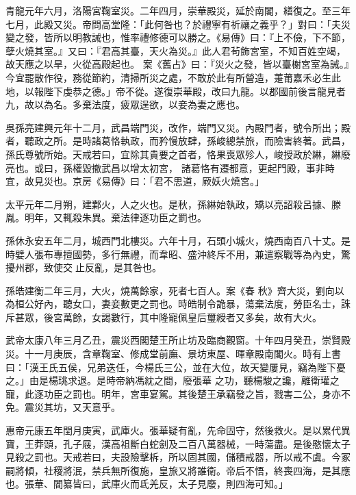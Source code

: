 \begin{pinyinscope}
 青龍元年六月，洛陽宮鞠室災。二年四月，崇華殿災，延於南閣，繕復之。至三年七月，此殿又災。帝問高堂隆：「此何咎也？於禮寧有祈禳之義乎？」對曰：「夫災變之發，皆所以明教誡也，惟率禮修德可以勝之。《易傳》曰：『上不儉，下不節，孽火燒其室。』又曰：『君高其臺，天火為災。』此人君茍飾宮室，不知百姓空竭，故天應之以旱，火從高殿起也。
 案《舊占》曰：『災火之發，皆以臺榭宮室為誡。』今宜罷散作役，務從節約，清掃所災之處，不敢於此有所營造，萐莆嘉禾必生此地，以報陛下虔恭之德。」帝不從。遂復崇華殿，改曰九龍。以郡國前後言龍見者九，故以為名。多棄法度，疲眾逞欲，以妾為妻之應也。



 吳孫亮建興元年十二月，武昌端門災，改作，端門又災。內殿門者，號令所出；殿者，聽政之所。是時諸葛恪執政，而矜慢放肆，孫峻總禁旅，而險害終著。武昌，孫氏尊號所始。天戒若曰，宜除其貴要之首者，恪果喪眾殄人，峻授政於綝，綝廢亮也。或曰，孫權毀撤武昌以增太初宮，
 諸葛恪有遷都意，更起門殿，事非時宜，故見災也。京房《易傳》曰：「君不思道，厥妖火燒宮。」



 太平元年二月朔，建鄴火，人之火也。是秋，孫綝始執政，矯以亮詔殺呂據、滕胤。明年，又輒殺朱異。棄法律逐功臣之罰也。



 孫休永安五年二月，城西門北樓災。六年十月，石頭小城火，燒西南百八十丈。是時嬖人張布專擅國勢，多行無禮，而韋昭、盛沖終斥不用，兼遣察戰等為內史，驚擾州郡，致使交止反亂，是其咎也。



 孫皓建衡二年三月，大火，燒萬餘家，死者七百人。案《春
 秋》齊大災，劉向以為桓公好內，聽女口，妻妾數更之罰也。時皓制令詭暴，蕩棄法度，勞臣名士，誅斥甚眾，後宮萬餘，女謁數行，其中隆寵佩皇后璽綬者又多矣，故有大火。



 武帝太康八年三月乙丑，震災西閣楚王所止坊及臨商觀窗。十年四月癸丑，崇賢殿災。十一月庚辰，含章鞠室、修成堂前廡、景坊東屋、暉章殿南閣火。時有上書曰：「漢王氏五侯，兄弟迭任，今楊氏三公，並在大位，故天變屢見，竊為陛下憂之。」由是楊珧求退。是時帝納馮紞之間，廢張華
 之功，聽楊駿之讒，離衛瓘之寵，此逐功臣之罰也。明年，宮車宴駕。其後楚王承竊發之旨，戮害二公，身亦不免。震災其坊，又天意乎。



 惠帝元康五年閏月庚寅，武庫火。張華疑有亂，先命固守，然後救火。是以累代異寶，王莽頭，孔子屐，漢高祖斷白蛇劍及二百八萬器械，一時蕩盡。是後愍懷太子見殺之罰也。天戒若曰，夫設險擊柝，所以固其國，儲積戒器，所以戒不虞。今冢嗣將傾，社稷將泯，禁兵無所復施，皇旅又將誰衛。帝后不悟，終喪四海，是其應也。張華、閻纂皆曰，武庫火而氐羌反，太子見廢，則四海可知。」




\end{pinyinscope}
